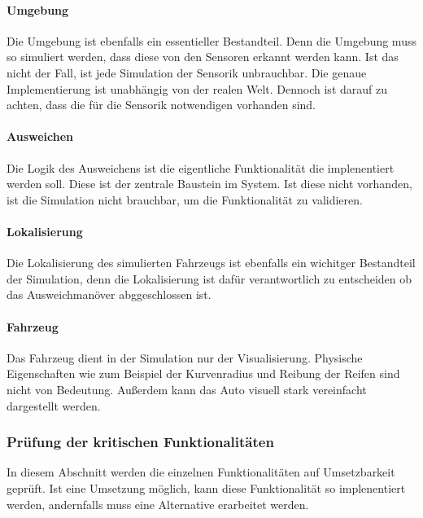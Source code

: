 \paragraph{Umgebung}
Die Umgebung ist ebenfalls ein essentieller Bestandteil. Denn die Umgebung muss so simuliert werden, dass diese von den Sensoren erkannt werden kann. Ist das nicht der Fall, ist jede Simulation der Sensorik unbrauchbar.
Die genaue Implementierung ist unabhängig von der realen Welt. Dennoch ist darauf zu achten, dass die für die Sensorik notwendigen vorhanden sind.

\paragraph{Ausweichen}
Die Logik des Ausweichens ist die eigentliche Funktionalität die implenentiert werden soll. Diese ist der zentrale Baustein im System. 
Ist diese nicht vorhanden, ist die Simulation nicht brauchbar, um die Funktionalität zu validieren.

\paragraph{Lokalisierung}
Die Lokalisierung des simulierten Fahrzeugs ist ebenfalls ein wichitger Bestandteil der Simulation, denn die Lokalisierung ist dafür verantwortlich zu entscheiden ob das Ausweichmanöver abggeschlossen ist.

\paragraph{Fahrzeug}
Das Fahrzeug dient in der Simulation nur der Visualisierung. Physische Eigenschaften wie zum Beispiel der Kurvenradius und Reibung der Reifen sind nicht von Bedeutung. Außerdem kann das Auto visuell stark vereinfacht dargestellt werden. 


\subsubsection{Prüfung der kritischen Funktionalitäten}
\label{Prüfung}
In diesem Abschnitt werden die einzelnen Funktionalitäten auf Umsetzbarkeit geprüft. Ist eine Umsetzung möglich, kann diese Funktionalität so implenentiert werden, andernfalls muss eine Alternative erarbeitet werden.

